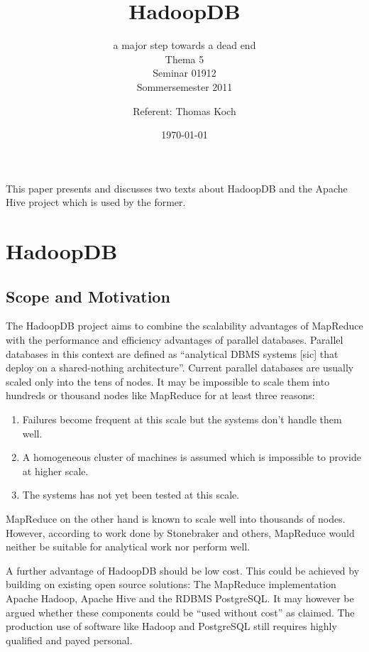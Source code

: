 \documentclass[12pt,a4paper]{scrartcl}		%
\begin{document}
\title{HadoopDB}
\subtitle{a major step towards a dead end\\
Thema 5\\Seminar 01912\\ Sommersemester 2011}
\author{Referent: Thomas Koch}
\date{\today}
\maketitle{}

\newpage{}
\tableofcontents{}
\newpage{}

This paper presents and discusses two texts about HadoopDB\cite{journals/pvldb/AbouzeidBARS09} and the Apache Hive\cite{Thusoo_hive-a} project which is used by the former.

\section{HadoopDB}

\subsection{Scope and Motivation}

The HadoopDB project aims to combine the scalability advantages of MapReduce with the performance and efficiency advantages of parallel databases. Parallel databases in this context are defined as ``analytical DBMS systems [sic] that deploy on a shared-nothing architecture''. 
Current parallel databases are usually scaled only into the tens of nodes. It may be impossible to scale them into hundreds or thousand nodes like MapReduce for at least three reasons:

\begin{enumerate}
\item Failures become frequent at this scale but the systems don't handle them well.
\item A homogeneous cluster of machines is assumed which is impossible to provide at higher scale.
\item The systems has not yet been tested at this scale.
\end{enumerate}

MapReduce on the other hand is known to scale well into thousands of nodes. However, according to work done by Stonebraker and others, MapReduce would neither be suitable for analytical work\cite{sto08stepback} nor perform well\cite{Pavlo09}.

A further advantage of HadoopDB should be low cost. This could be achieved by building on existing open source solutions: The MapReduce implementation Apache Hadoop, Apache Hive and the RDBMS PostgreSQL. It may however be argued whether these components could be ``used without cost'' as claimed. The production use of software like Hadoop and PostgreSQL still requires highly qualified and payed personal.
\end{document}
